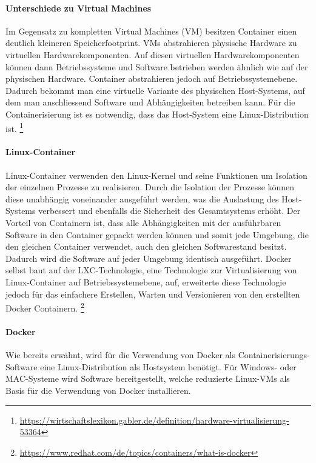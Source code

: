 \paragraph{Unterschiede zu Virtual Machines}
Im Gegensatz zu kompletten Virtual Machines (VM) besitzen Container einen deutlich kleineren Speicherfootprint.
VMs abstrahieren physische Hardware zu virtuellen Hardwarekomponenten. Auf diesen virtuellen Hardwarekomponenten können dann Betriebssysteme
und Software betrieben werden ähnlich wie auf der physischen Hardware.
Container abstrahieren jedoch auf Betriebssystemebene.
Dadurch bekommt man eine virtuelle Variante des physischen Host-Systems, auf dem man anschliessend Software und Abhängigkeiten betreiben kann.
Für die Containerisierung ist es notwendig, dass das Host-System eine Linux-Distribution ist.
\footnote{\url{https://wirtschaftslexikon.gabler.de/definition/hardware-virtualisierung-53364}}

\paragraph{Linux-Container}
Linux-Container verwenden den Linux-Kernel und seine Funktionen um Isolation der einzelnen Prozesse zu realisieren.
Durch die Isolation der Prozesse können diese unabhängig voneinander ausgeführt werden,
was die Auslastung des Host-Systems verbessert und ebenfalls die Sicherheit des Gesamtsystems erhöht.
Der Vorteil von Containern ist, dass alle Abhängigkeiten mit der ausführbaren Software in den Container gepackt werden können und somit jede
Umgebung, die den gleichen Container verwendet, auch den gleichen Softwarestand besitzt.
Dadurch wird die Software auf jeder Umgebung identisch ausgeführt.
Docker selbst baut auf der LXC-Technologie, eine Technologie zur Virtualisierung von Linux-Container auf Betriebssystemebene, auf,
erweiterte diese Technologie jedoch für das einfachere Erstellen, Warten und Versionieren von den erstellten Docker Containern.
\footnote{\url{https://www.redhat.com/de/topics/containers/what-is-docker}}

\paragraph{Docker}
Wie bereits erwähnt, wird für die Verwendung von Docker als Containerisierungs-Software eine Linux-Distribution als Hostsystem benötigt.
Für Windows- oder MAC-Systeme wird Software bereitgestellt, welche reduzierte Linux-VMs als Basis für die Verwendung von Docker installieren.

